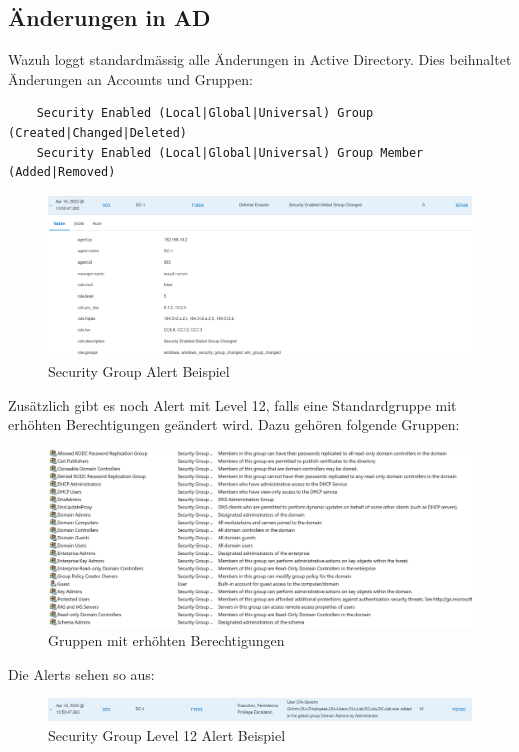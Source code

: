 \subsection{Änderungen in AD}
Wazuh loggt standardmässig alle Änderungen in Active Directory.
Dies beihnaltet Änderungen an Accounts und Gruppen:
\begin{lstlisting}
    Security Enabled (Local|Global|Universal) Group (Created|Changed|Deleted)
    Security Enabled (Local|Global|Universal) Group Member (Added|Removed)
\end{lstlisting}
\begin{figure}[H]
    \centering
    \includegraphics[width=0.7\linewidth]{../img/IAM/security-group-alert-example.png}
    \caption{Security Group Alert Beispiel}
\end{figure}

Zusätzlich gibt es noch Alert mit Level 12, falls eine Standardgruppe mit erhöhten Berechtigungen geändert wird.
Dazu gehören folgende Gruppen:
\begin{figure}[H]
    \centering
    \includegraphics[width=0.7\linewidth]{../img/IAM/high-privilege-groups.png}
    \caption{Gruppen mit erhöhten Berechtigungen}
\end{figure}
Die Alerts sehen so aus:
\begin{figure}[H]
    \centering
    \includegraphics[width=\linewidth]{../img/IAM/alert-added-to-privilege-group.png}
    \caption{Security Group Level 12 Alert Beispiel}
\end{figure}